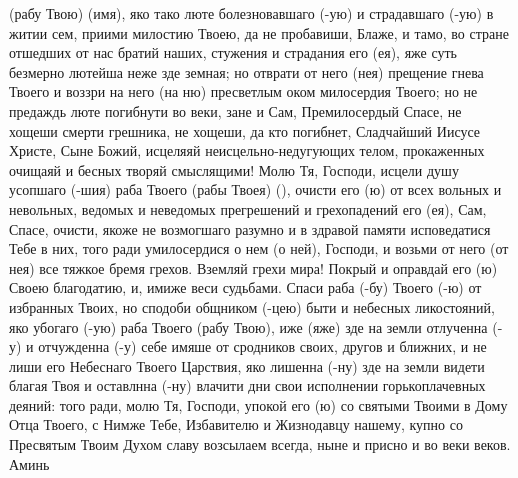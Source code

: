 \begin{mymulticols}
(рабу Твою) (имя), яко тако люте болезновавшаго (-ую) и страдавшаго (-ую) в житии сем, приими милостию Твоею, да не пробавиши, Блаже, и тамо, во стране отшедших от нас братий наших, стужения и страдания его (ея), яже суть безмерно лютейша неже зде земная; но отврати от него (нея) прещение гнева Твоего и воззри на него (на ню) пресветлым оком милосердия Твоего; но не предаждь люте погибнути во веки, зане и Сам, Премилосердый Спасе, не хощеши смерти грешника, не хощеши, да кто погибнет, Сладчайший Иисусе Христе, Сыне Божий, исцеляяй неисцельно-недугующих телом, прокаженных очищаяй и бесных творяй смыслящими! Молю Тя, Господи, исцели душу усопшаго (-шия) раба Твоего (рабы Твоея) (), очисти его (ю) от всех вольных и невольных, ведомых и неведомых прегрешений и грехопадений его (ея), Сам, Спасе, очисти, якоже не возмогшаго разумно и в здравой памяти исповедатися Тебе в них, того ради умилосердися о нем (о ней), Господи, и возьми от него (от нея) все тяжкое бремя грехов. Вземляй грехи мира! Покрый и оправдай его (ю) Своею благодатию, и, имиже веси судьбами. Спаси раба (-бу) Твоего (-ю) от избранных Твоих, но сподоби общником (-цею) быти и небесных ликостояний, яко убогаго (-ую) раба Твоего (рабу Твою), иже (яже) зде на земли отлученна (-у) и отчужденна (-у) себе имяше от сродников своих, другов и ближних, и не лиши его Небеснаго Твоего Царствия, яко лишенна (-ну) зде на земли видети благая Твоя и оставлнна (-ну) влачити дни свои исполнении горькоплачевных деяний: того ради, молю Тя, Господи, упокой его (ю) со святыми Твоими в Дому Отца Твоего, с Нимже Тебе, Избавителю и Жизнодавцу нашему, купно со Пресвятым Твоим Духом славу возсылаем всегда, ныне и присно и во веки веков. Аминь

\end{mymulticols}

\mychapterending


